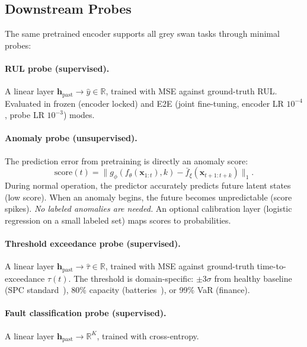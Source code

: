 \documentclass{article}
\newcommand{\R}{\mathbb{R}}
\newcommand{\x}{\mathbf{x}}
\newcommand{\h}{\mathbf{h}}
\newcommand{\encoder}{f_\theta}
\newcommand{\predictor}{g_\phi}
\newcommand{\target}{\bar{f}_\xi}
\begin{document}
\subsection{Downstream Probes}
\label{sec:probes}

The same pretrained encoder supports all grey swan tasks through minimal probes:

\paragraph{RUL probe (supervised).} A linear layer $\h_\text{past} \to \hat{y} \in \R$, trained with MSE against ground-truth RUL. Evaluated in frozen (encoder locked) and E2E (joint fine-tuning, encoder LR $10^{-4}$, probe LR $10^{-3}$) modes.

\paragraph{Anomaly probe (unsupervised).}
\label{sec:anomaly_probe}
The prediction error from pretraining is directly an anomaly score:
\begin{equation}
  \text{score}(t) = \|\predictor(\encoder(\x_{1:t}), k) - \target(\x_{t+1:t+k})\|_1.
  \label{eq:anomaly_score}
\end{equation}
During normal operation, the predictor accurately predicts future latent states (low score). When an anomaly begins, the future becomes unpredictable (score spikes). \emph{No labeled anomalies are needed.} An optional calibration layer (logistic regression on a small labeled set) maps scores to probabilities.

\paragraph{Threshold exceedance probe (supervised).} A linear layer $\h_\text{past} \to \hat{\tau} \in \R$, trained with MSE against ground-truth time-to-exceedance $\tau(t)$. The threshold is domain-specific: $\pm 3\sigma$ from healthy baseline (SPC standard~\citep{montgomery2020spc}), 80\% capacity (batteries~\citep{severson2019battery}), or 99\% VaR (finance).

\paragraph{Fault classification probe (supervised).} A linear layer $\h_\text{past} \to \R^K$, trained with cross-entropy.

\end{document}
